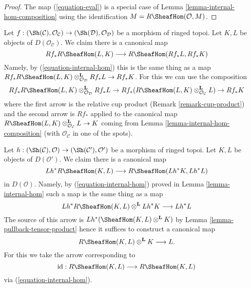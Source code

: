 \begin{proof}
The map (\ref{equation-eval}) is a special case of
Lemma \ref{lemma-internal-hom-composition}
using the identification $M = R\SheafHom(\mathcal{O}, M)$.
\end{proof}

\begin{remark}
\label{remark-projection-formula-for-internal-hom}
Let $f : (\Sh(\mathcal{C}), \mathcal{O}_\mathcal{C}) \to
(\Sh(\mathcal{D}), \mathcal{O}_\mathcal{D})$ be a morphism of ringed topoi.
Let $K, L$ be objects of $D(\mathcal{O}_\mathcal{C})$. We claim there is
a canonical map
$$
Rf_*R\SheafHom(L, K) \longrightarrow R\SheafHom(Rf_*L, Rf_*K)
$$
Namely, by (\ref{equation-internal-hom}) this is the same thing
as a map
$Rf_*R\SheafHom(L, K) \otimes_{\mathcal{O}_\mathcal{D}}^\mathbf{L} Rf_*L
\to Rf_*K$.
For this we can use the composition
$$
Rf_*R\SheafHom(L, K) \otimes_{\mathcal{O}_\mathcal{D}}^\mathbf{L} Rf_*L \to
Rf_*(R\SheafHom(L, K) \otimes_{\mathcal{O}_\mathcal{C}}^\mathbf{L} L) \to
Rf_*K
$$
where the first arrow is the relative cup product
(Remark \ref{remark-cup-product}) and the second arrow is $Rf_*$ applied
to the canonical map
$R\SheafHom(L, K) \otimes_{\mathcal{O}_\mathcal{C}}^\mathbf{L} L \to K$
coming from Lemma \ref{lemma-internal-hom-composition}
(with $\mathcal{O}_\mathcal{C}$ in one of the spots).
\end{remark}

\begin{remark}
\label{remark-prepare-fancy-base-change}
Let $h : (\Sh(\mathcal{C}), \mathcal{O}) \to (\Sh(\mathcal{C}'), \mathcal{O}')$
be a morphism of ringed topoi. Let $K, L$ be objects of $D(\mathcal{O}')$.
We claim there is a canonical map
$$
Lh^*R\SheafHom(K, L) \longrightarrow R\SheafHom(Lh^*K, Lh^*L)
$$
in $D(\mathcal{O})$. Namely, by (\ref{equation-internal-hom})
proved in Lemma \ref{lemma-internal-hom}
such a map is the same thing as a map
$$
Lh^*R\SheafHom(K, L) \otimes^\mathbf{L} Lh^*K \longrightarrow Lh^*L
$$
The source of this arrow is $Lh^*(\SheafHom(K, L) \otimes^\mathbf{L} K)$
by Lemma \ref{lemma-pullback-tensor-product}
hence it suffices to construct a canonical map
$$
R\SheafHom(K, L) \otimes^\mathbf{L} K \longrightarrow L.
$$
For this we take the arrow corresponding to
$$
\text{id} :
R\SheafHom(K, L)
\longrightarrow
R\SheafHom(K, L)
$$
via (\ref{equation-internal-hom}).
\end{remark}

